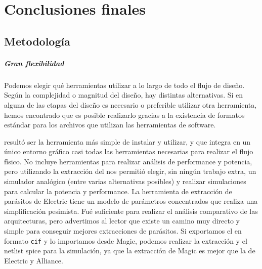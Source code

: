 	\chapter{Conclusiones finales}

  
\section{Metodología}
\paragraph{Gran flexibilidad} Podemos elegir qué herramientas utilizar a lo largo de todo el flujo de diseño. Según la complejidad o magnitud del diseño, hay distintas alternativas. Si en alguna de las etapas del diseño es necesario o preferible utilizar otra herramienta, hemos encontrado que es posible realizarlo gracias a la existencia de formatos estándar para los archivos que utilizan las herramientas de software.



 resultó ser la herramienta más simple de instalar y utilizar, y que integra en un único entorno gráfico casi todas las herramientas necesarias para realizar el flujo físico. No incluye herramientas para realizar análisis de performance y potencia, pero utilizando la extracción del  nos permitió elegir, sin ningún trabajo extra, un simulador analógico (entre varias alternativas posibles) y realizar simulaciones para calcular la potencia y performance. La herramienta de extracción de parásitos de Electric tiene un modelo de parámetros concentrados que realiza una simplificación pesimista. Fué suficiente para realizar el análisis comparativo de las arquitecturas, pero advertimos al lector que existe un camino muy directo y simple para conseguir mejores extracciones de parásitos. Si exportamos el  en formato \verb.cif. y lo importamos desde Magic, podemos realizar la extracción y el netlist spice para la simulación, ya que la extracción de Magic es mejor que la de Electric y Alliance.

